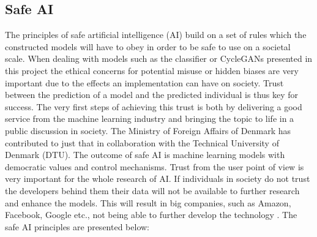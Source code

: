 \documentclass[12pt, fleqn, titlepage]{article}
\newcommand{\1}[1]{\mathds{1}\left[#1\right]}
\begin{document}
\subsection{Safe AI}

The principles of safe artificial intelligence (AI) build on a set of rules which the constructed models will have to obey in order to be safe to use on a societal scale. When dealing with models such as the classifier or CycleGANs presented in this project the ethical concerns for potential misuse or hidden biases are very important due to the effects an implementation can have on society. Trust between the prediction of a model and the predicted individual is thus key for success. The very first steps of achieving this trust is both by delivering a good service from the machine learning industry and bringing the topic to life in a public discussion in society. The Ministry of Foreign Affairs of Denmark has contributed to just that in collaboration with the Technical University of Denmark (DTU). The outcome of safe AI is machine learning models with democratic values and control mechanisms. Trust from the user point of view is very important for the whole research of AI. If individuals in society do not trust the developers behind them their data will not be available to further research and enhance the models. This will result in big companies, such as Amazon, Facebook, Google etc., not being able to further develop the technology \cite{larsk}. The safe AI principles are presented below:
\end{document}
